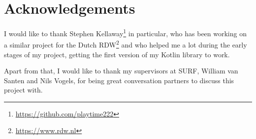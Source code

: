 \chapter*{Acknowledgements}
I would like to thank Stephen Kellaway\footnote{\url{https://github.com/playtime222}} in particular, who has been working on a similar project for the Dutch RDW\footnote{\url{https://www.rdw.nl}} and who helped me a lot during the early stages of my project, getting the first version of my Kotlin library to work.

Apart from that, I would like to thank my supervisors at SURF, William van Santen and Nils Vogels, for being great conversation partners to discuss this project with. 
